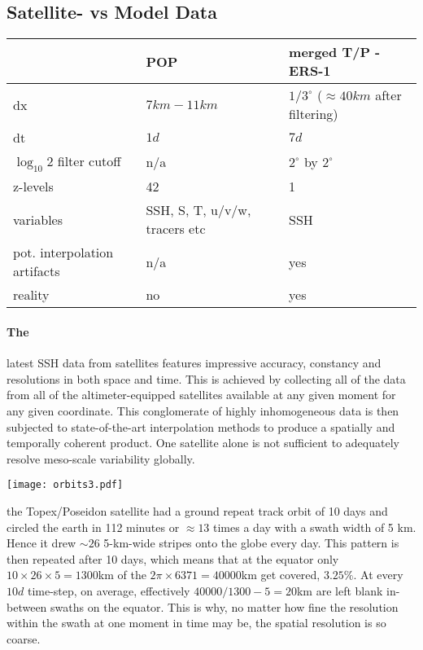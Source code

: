 \subsection{Satellite- vs Model Data} \label{subsec:satvsmod}
\begin{margintable}
\begin{tabularx}{\textwidth}{ |X|X|X| }
  \hline
   & \bf{POP} & \bf{merged T/P - ERS-1 }  \\
  \hline
  dx & $7km-11km$  & $1/3^{\circ}$ ($\approx 40 km$ after filtering)  \\
  \hline
  dt & $1d$  & $7d$  \\
  \hline
  $\log_{10}2$ filter cutoff & n/a  & $2^{\circ} $ by $ 2^{\circ} $  \\
  \hline
  z-levels & 42  & 1  \\
  \hline
  variables & SSH, S, T, u/v/w, tracers etc & SSH  \\
  \hline
	pot. interpolation artifacts & n/a  & yes  \\
  \hline
	reality & no  & yes  \\
  \hline
\end{tabularx}
\label{table:modVSsat}
\end{margintable}

\paragraph{The } latest \AVI SSH data from satellites features impressive accuracy, constancy and resolutions in both space and time. This is achieved
by collecting all of the data from all of the altimeter-equipped satellites available at any given moment for any given coordinate. This conglomerate of highly
inhomogeneous data is then subjected to state-of-the-art interpolation methods to produce a spatially and temporally coherent product. One satellite alone is
not sufficient to adequately resolve meso-scale variability globally.
\begin{marginfigure}
\texttt{[image: orbits3.pdf]}
\end{marginfigure}
\Eg the Topex/Poseidon satellite had a ground repeat track orbit of 10 days and circled the earth in 112 minutes or $\approx 13$ times a day with a swath width of 5 km. Hence it drew $\sim 26$ 5-km-wide stripes onto the globe every day.
This pattern is then repeated after 10 days, which means that at the equator only $10 \times 26 \times 5=1300$km of the $2\pi \times 6371=40000$km get covered,
\ie $3.25\%$. At every $10d$ time-step, on average, effectively
$40000/1300-5= 20$km are left blank in-between swaths on the equator. This is why, no matter how fine the resolution within the swath at one moment in time may
be, the spatial resolution is so coarse.


